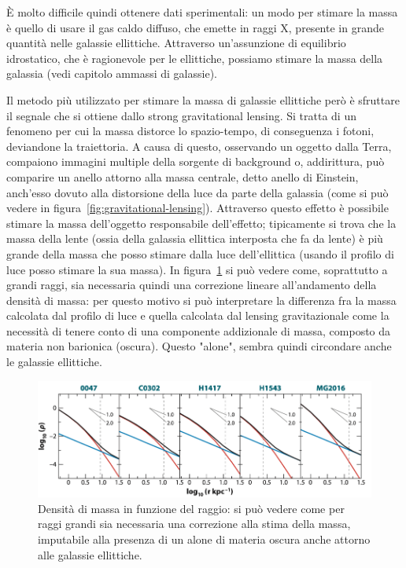 È molto difficile quindi ottenere dati sperimentali: un modo per stimare la massa è quello di usare il gas caldo diffuso, che emette in raggi X, presente in grande quantità nelle galassie ellittiche. Attraverso un’assunzione di equilibrio idrostatico, che è ragionevole per le ellittiche, possiamo stimare la massa della galassia (vedi capitolo ammassi di galassie).

Il metodo più utilizzato per stimare la massa di galassie ellittiche però è sfruttare il segnale che si ottiene dallo strong gravitational lensing. Si tratta di un fenomeno per cui la massa distorce lo spazio-tempo, di conseguenza i fotoni, deviandone la traiettoria. A causa di questo, osservando un oggetto dalla Terra, compaiono immagini multiple della sorgente di background o, addirittura, può comparire un anello attorno alla massa centrale, detto anello di Einstein, anch'esso dovuto alla distorsione della luce da parte della galassia (come si può vedere in figura~\ref{fig:gravitational-lensing}). Attraverso questo effetto è possibile stimare la massa dell’oggetto responsabile dell’effetto; tipicamente si trova che la massa della lente (ossia della galassia ellittica interposta che fa da lente) è più grande della massa che posso stimare dalla luce dell’ellittica (usando il profilo di luce posso stimare la sua massa). In figura~\ref{fig:materia-oscura-ellittiche} si può vedere come, soprattutto a grandi raggi, sia necessaria quindi una correzione lineare all'andamento della densità di massa: per questo motivo si può interpretare la differenza fra la massa calcolata dal profilo di luce e quella calcolata dal lensing gravitazionale come la necessità di tenere conto di una componente addizionale di massa, composto da materia non barionica (oscura). Questo "alone", sembra quindi circondare anche le galassie ellittiche.

\begin{figure}
    \centering
    \includegraphics[width = 0.8 \textwidth]{immagini/materia-oscura-ellittiche.png}
    \caption{Densità di massa in funzione del raggio: si può vedere come per raggi grandi sia necessaria una correzione alla stima della massa, imputabile alla presenza di un alone di materia oscura anche attorno alle galassie ellittiche.}
    \label{fig:materia-oscura-ellittiche}
\end{figure}